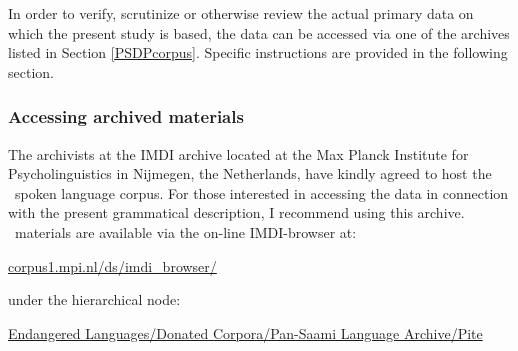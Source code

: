 In order to verify, scrutinize or otherwise review the actual primary data on which the present study is based, the data can be accessed via one of the archives listed in Section \ref{PSDPcorpus}. Specific instructions are provided in the following section. 


\subsubsection{Accessing archived materials}\label{archiveAccess}
The archivists at the IMDI archive located at the Max Planck Institute for Psycholinguistics in Nijmegen, the Netherlands, have kindly agreed to host the \PSDP\ spoken language corpus. For those interested in accessing the data in connection with the present grammatical description, I recommend using this archive. \PS\ materials are available via the on-line IMDI-browser at: 
\begin{center}\href{http://corpus1.mpi.nl/ds/imdi_browser/}{corpus1.mpi.nl/ds/imdi\_browser/}
\end{center}
under the hierarchical node:
\begin{center}\href{http://corpus1.mpi.nl/ds/imdi_browser/?openpath=MPI1565580\%23}{ Endangered Languages/Donated Corpora/Pan-Saami Language Archive/Pite}
\end{center}


